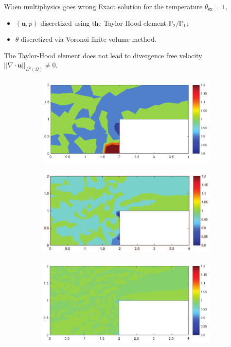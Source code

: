 \documentclass[aspectratio=169]{beamer}
\begin{document}
\begin{frame}{When multiphysics goes wrong}
	Exact solution for the temperature $\theta_{\mathrm{ex}}= 1$.
	\begin{itemize}
		\item $(\bm{u}, p)$ discretized using the Taylor-Hood element $\mathbb{P}_2/\mathbb{P}_1$;
		\item $\theta$ discretized via Voronoi finite volume method.
	\end{itemize}
The Taylor-Hood element does not lead to divergence free velocity $||\nabla \cdot \bm{u}||_{L^2(\Omega)} \neq 0$.
\begin{figure}[t]
	\begin{subfigure}[t]{0.32\textwidth}
		\includegraphics[width=\columnwidth]{Concentration_ref1.png}\\
	\end{subfigure}\hfill
	\begin{subfigure}[t]{0.32\textwidth}
		\includegraphics[width=\columnwidth]{Concentration_ref2.png}\\
	\end{subfigure}\hfill
	\begin{subfigure}[t]{0.32\textwidth}
		\includegraphics[width=\columnwidth]{Concentration_ref3.png}\\

\end{subfigure}
\end{figure}
\end{frame}
\end{document}
